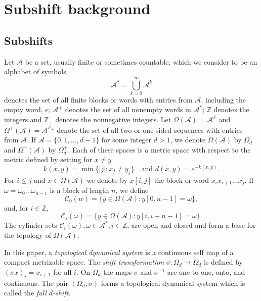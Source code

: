 \documentclass{kepart2010}
\theoremstyle{plain}
\theoremstyle{definition}
\theoremstyle{remark}
\theoremstyle{definition}
\numberwithin{equation}{section}
\begin{document}
\section{Subshift background}\label{sec_sftbackground}

\subsection{Subshifts}\label{sec_sfts}

Let ${{\mathcal A}}$ be a set, usually finite or sometimes countable, which we
consider to be an alphabet of symbols.
 \begin{equation} {{\mathcal A}}^*=\bigcup_{k=0}^\infty {{\mathcal A}}^k
 \end{equation}
denotes the set of all finite blocks or words with entries from
${{\mathcal A}}$, including the empty word, $\epsilon$;
 ${{\mathcal A}}^+$ denotes the set of all nonempty words in ${{\mathcal A}}^*$;
$\mathbb Z$ denotes the integers and $\mathbb Z_+$ denotes the
nonnegative integers.
 Let $\Omega({{\mathcal A}})={{\mathcal A}}^{\mathbb Z}$ and $\Omega^+({{\mathcal A}})={{\mathcal A}}^{{\mathbb Z}_+}$ denote the
set of all two or one-sided sequences with entries from ${{\mathcal A}}$. If
${{\mathcal A}}=\{ 0,1,\dots ,d-1\}$ for some integer $d>1$, we denote
$\Omega({{\mathcal A}})$ by $\Omega_d$ and $\Omega^+({{\mathcal A}})$ by $\Omega^+_d$.
Each of these spaces is a metric space with respect to the metric
defined by setting for $x\neq y$
 \begin{equation} k(x,y)=\min\{|j|:x_j \neq y_j\} \quad\text{and  }
 d(x,y)= e^{-k(x,y)}.
 \end{equation}
 For $i \leq j$ and $x \in \Omega({{\mathcal A}})$
we denote by $x [i,j]$ the block or word $x_ix_{i+1}\dots x_j$.  If
$\omega=\omega_0\dots \omega_{n-1}$ is a block of length $n$, we
define
 \begin{equation} {{\mathcal C}}_0(w)=\{y \in \Omega({{\mathcal A}}):y[0,n-1]=\omega\} ,
 \end{equation}
 and, for $i \in {\mathbb Z}$,
 \begin{equation}
 {{\mathcal C}}_i(\omega)=\{y \in \Omega({{\mathcal A}}):y[i,i+n-1]=\omega\} .
\end{equation} The cylinder sets ${{\mathcal C}}_i(\omega),\omega \in {{\mathcal A}}^*, i\in \mathbb
Z$,
are open and
closed and form a base for the topology of $\Omega({{\mathcal A}})$.

In this paper, a {\em topological dynamical system} is
a continuous self map of a compact metrizable space.
The {\em shift transformation} $\sigma : \Omega_d \to \Omega_d$ is
defined by $(\sigma x)_i=x_{i+1}$ for all $i$. On $\Omega_d$ the
maps $\sigma$ and $\sigma^{-1}$ are one-to-one, onto, and
continuous. The pair $(\Omega_d, \sigma)$ forms a  topological
dynamical system  which is called the {\em full $d$-shift}.
\end{document}
